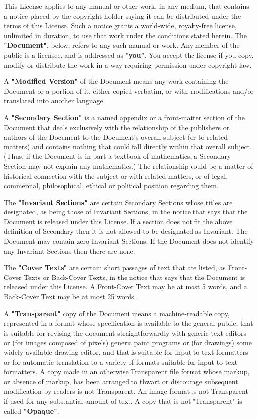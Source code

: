This License applies to any manual or other work, in any medium, that
contains a notice placed by the copyright holder saying it can be
distributed under the terms of this License.  Such a notice grants a
world-wide, royalty-free license, unlimited in duration, to use that
work under the conditions stated herein.  The \textbf{"Document"}, below,
refers to any such manual or work.  Any member of the public is a
licensee, and is addressed as \textbf{"you"}.  You accept the license if you
copy, modify or distribute the work in a way requiring permission
under copyright law.

A \textbf{"Modified Version"} of the Document means any work containing the
Document or a portion of it, either copied verbatim, or with
modifications and/or translated into another language.

A \textbf{"Secondary Section"} is a named appendix or a front-matter section of
the Document that deals exclusively with the relationship of the
publishers or authors of the Document to the Document's overall subject
(or to related matters) and contains nothing that could fall directly
within that overall subject.  (Thus, if the Document is in part a
textbook of mathematics, a Secondary Section may not explain any
mathematics.)  The relationship could be a matter of historical
connection with the subject or with related matters, or of legal,
commercial, philosophical, ethical or political position regarding
them.

The \textbf{"Invariant Sections"} are certain Secondary Sections whose titles
are designated, as being those of Invariant Sections, in the notice
that says that the Document is released under this License.  If a
section does not fit the above definition of Secondary then it is not
allowed to be designated as Invariant.  The Document may contain zero
Invariant Sections.  If the Document does not identify any Invariant
Sections then there are none.

The \textbf{"Cover Texts"} are certain short passages of text that are listed,
as Front-Cover Texts or Back-Cover Texts, in the notice that says that
the Document is released under this License.  A Front-Cover Text may
be at most 5 words, and a Back-Cover Text may be at most 25 words.

A \textbf{"Transparent"} copy of the Document means a machine-readable copy,
represented in a format whose specification is available to the
general public, that is suitable for revising the document
straightforwardly with generic text editors or (for images composed of
pixels) generic paint programs or (for drawings) some widely available
drawing editor, and that is suitable for input to text formatters or
for automatic translation to a variety of formats suitable for input
to text formatters.  A copy made in an otherwise Transparent file
format whose markup, or absence of markup, has been arranged to thwart
or discourage subsequent modification by readers is not Transparent.
An image format is not Transparent if used for any substantial amount
of text.  A copy that is not "Transparent" is called \textbf{"Opaque"}.

